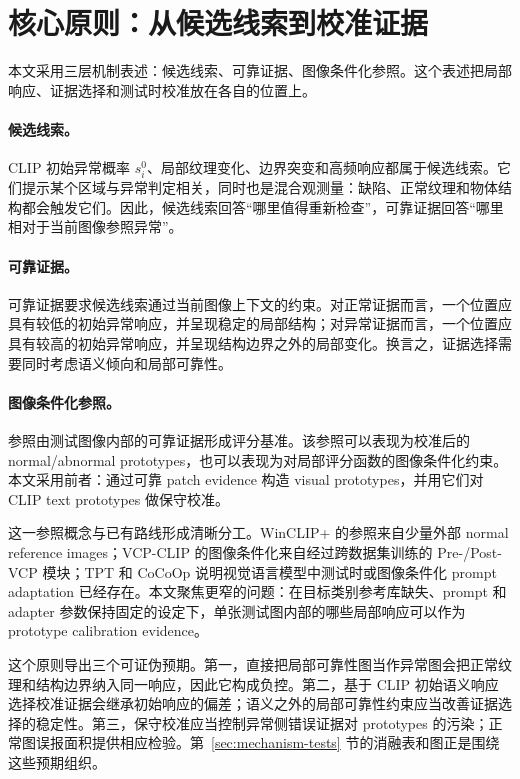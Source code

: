\section{核心原则：从候选线索到校准证据}

本文采用三层机制表述：候选线索、可靠证据、图像条件化参照。这个表述把局部响应、证据选择和测试时校准放在各自的位置上。

\paragraph{候选线索。}
CLIP 初始异常概率 $s_i^0$、局部纹理变化、边界突变和高频响应都属于候选线索。它们提示某个区域与异常判定相关，同时也是混合观测量：缺陷、正常纹理和物体结构都会触发它们。因此，候选线索回答“哪里值得重新检查”，可靠证据回答“哪里相对于当前图像参照异常”。

\paragraph{可靠证据。}
可靠证据要求候选线索通过当前图像上下文的约束。对正常证据而言，一个位置应具有较低的初始异常响应，并呈现稳定的局部结构；对异常证据而言，一个位置应具有较高的初始异常响应，并呈现结构边界之外的局部变化。换言之，证据选择需要同时考虑语义倾向和局部可靠性。

\paragraph{图像条件化参照。}
参照由测试图像内部的可靠证据形成评分基准。该参照可以表现为校准后的 normal/abnormal prototypes，也可以表现为对局部评分函数的图像条件化约束。本文采用前者：通过可靠 patch evidence 构造 visual prototypes，并用它们对 CLIP text prototypes 做保守校准。

这一参照概念与已有路线形成清晰分工。WinCLIP+ 的参照来自少量外部 normal reference images；VCP-CLIP 的图像条件化来自经过跨数据集训练的 Pre-/Post-VCP 模块；TPT 和 CoCoOp 说明视觉语言模型中测试时或图像条件化 prompt adaptation 已经存在。本文聚焦更窄的问题：在目标类别参考库缺失、prompt 和 adapter 参数保持固定的设定下，单张测试图内部的哪些局部响应可以作为 prototype calibration evidence。

这个原则导出三个可证伪预期。第一，直接把局部可靠性图当作异常图会把正常纹理和结构边界纳入同一响应，因此它构成负控。第二，基于 CLIP 初始语义响应选择校准证据会继承初始响应的偏差；语义之外的局部可靠性约束应当改善证据选择的稳定性。第三，保守校准应当控制异常侧错误证据对 prototypes 的污染；正常图误报面积提供相应检验。第~\ref{sec:mechanism-tests} 节的消融表和图正是围绕这些预期组织。
